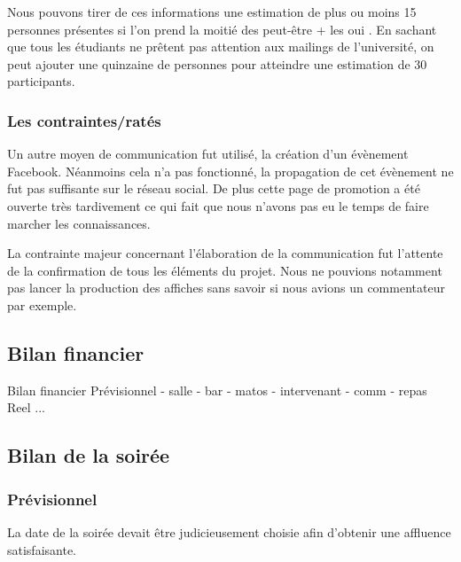 Nous pouvons tirer de ces informations une estimation de plus ou moins 15 personnes présentes si l’on prend
la moitié des \og peut-être \fg{} + les \og oui \fg{}.
En sachant que tous les étudiants ne prêtent pas attention aux mailings de l’université, on peut ajouter
une quinzaine de personnes pour atteindre une estimation de 30 participants.
\subsubsection{Les contraintes/ratés}%
\label{ssub:les_contraintes_rates}

Un autre moyen de communication fut utilisé, la création d'un évènement
Facebook. Néanmoins cela n'a pas fonctionné, la propagation de cet
évènement ne fut pas suffisante sur le réseau social. De plus cette page
de promotion a été ouverte très tardivement ce qui fait que  nous
n'avons pas eu le temps de faire marcher les connaissances.

La contrainte majeur concernant l'élaboration de la communication fut l'attente
de la confirmation de tous les éléments du projet.  Nous ne pouvions
notamment pas lancer la production des affiches sans savoir si nous
avions un commentateur par exemple.


\subsection{Bilan financier}%
\label{sub:bilan_financier}

Bilan financier
        Prévisionnel
            - salle
            - bar
            - matos
            - intervenant
            - comm
            - repas
        Reel
           ...

\subsection{Bilan de la soirée}%
\label{sub:Bilan_de_la_soiree}

\subsubsection{Prévisionnel}%
\label{ssub:previsionnel}

La date de la soirée devait être judicieusement choisie afin d'obtenir une affluence satisfaisante.

